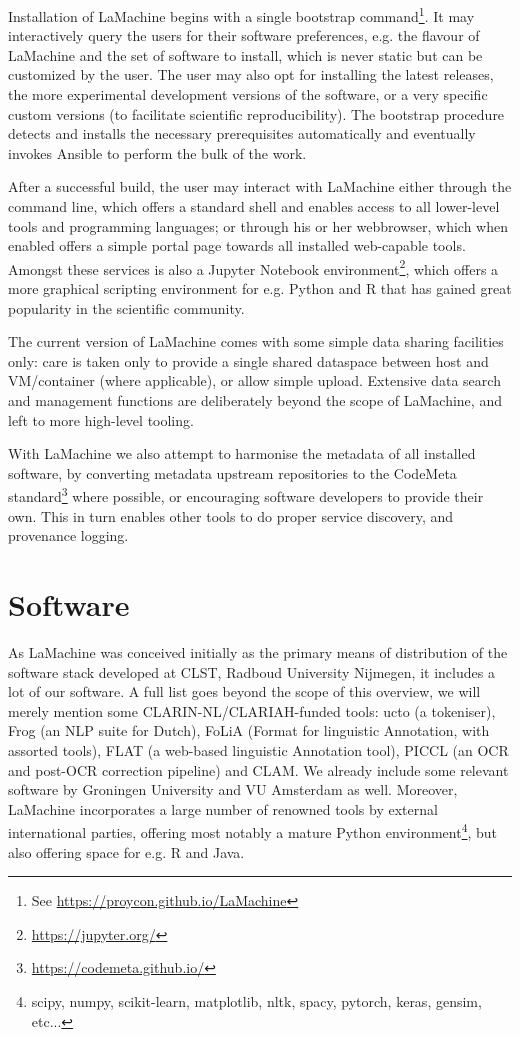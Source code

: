 \documentclass[a4paper,11pt]{article}
\begin{document}
Installation of LaMachine begins with a single bootstrap command\footnote{See
\url{https://proycon.github.io/LaMachine}}.  It may interactively query the users for their software preferences, e.g.
the flavour of LaMachine and the set of software to install, which is never static but can be customized by the user.
The user may also opt for installing the latest releases, the more experimental development versions of the software, or
a very specific custom versions (to facilitate scientific reproducibility). The bootstrap procedure detects and installs
the necessary prerequisites automatically and eventually invokes Ansible to perform the bulk of the work.

After a successful build, the user may interact with LaMachine either through the command line, which offers a standard
shell and enables access to all lower-level tools and programming languages; or through his or her webbrowser, which
when enabled offers a simple portal page towards all installed web-capable tools. Amongst these services is also a
Jupyter Notebook environment\footnote{\url{https://jupyter.org/}}, which offers a more graphical scripting environment
for e.g. Python and R that has gained great popularity in the scientific community.

The current version of LaMachine comes with some simple data sharing facilities only: care is taken only to provide a
single shared dataspace between host and VM/container (where applicable), or allow simple upload. Extensive data
search and management functions are deliberately beyond the scope of LaMachine, and left to more high-level tooling.

With LaMachine we also attempt to harmonise the metadata of all installed software, by converting metadata upstream repositories to
the CodeMeta standard\footnote{\url{https://codemeta.github.io/}} \cite{codemeta,codemetar} where possible, or encouraging software developers to provide
their own. This in turn enables other tools to do proper service discovery, and provenance logging.

\section{Software}

As LaMachine was conceived initially as the primary means of distribution of the software stack developed at CLST,
Radboud University Nijmegen, it includes a lot of our software. A full list goes beyond the scope of this overview, we
will merely mention some CLARIN-NL/CLARIAH-funded tools: ucto (a tokeniser), Frog (an NLP suite for Dutch), FoLiA (Format
for linguistic Annotation, with assorted tools), FLAT (a web-based linguistic Annotation tool), PICCL (an OCR and
post-OCR correction pipeline) and CLAM. We already include some relevant software by Groningen University and VU
Amsterdam as well. Moreover, LaMachine incorporates a large number of renowned tools by external international parties,
offering most notably a mature Python environment\footnote{scipy, numpy, scikit-learn, matplotlib, nltk, spacy, pytorch,
keras, gensim, etc...}, but also offering space for e.g. R and Java.
\end{document}

